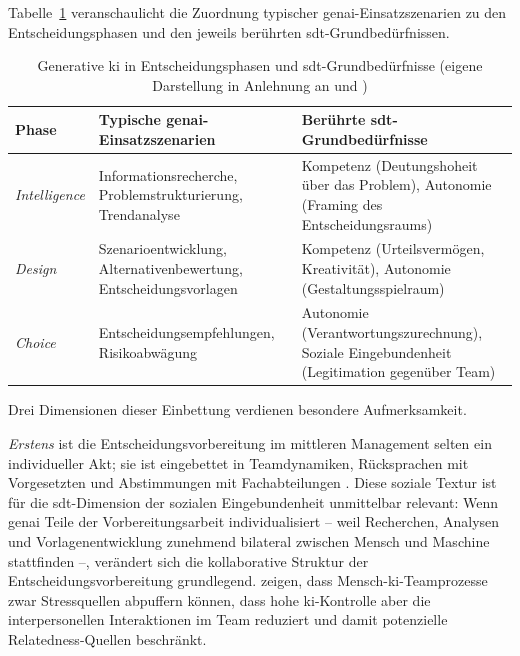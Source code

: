 Tabelle~\ref{tab:ki-entscheidungsphasen} veranschaulicht die Zuordnung typischer \gls{genai}-Einsatzszenarien zu den Entscheidungsphasen und den jeweils berührten \acrshort{sdt}-Grundbedürfnissen.

\begin{table}[ht]
\centering
\caption{Generative \acrshort{ki} in Entscheidungsphasen und \acrshort{sdt}-Grundbedürfnisse (eigene Darstellung in Anlehnung an \textcite{simonNewScienceManagement1977} und \textcite{hermannGenAIPsychologyWork2025})}
\label{tab:ki-entscheidungsphasen}
\begin{tabularx}{\textwidth}{lXX}
\toprule
\textbf{Phase} & \textbf{Typische \acrshort{genai}-Einsatzszenarien} & \textbf{Berührte \acrshort{sdt}-Grundbedürfnisse} \\
\midrule
\textit{Intelligence} & Informationsrecherche, Problemstrukturierung, Trendanalyse & Kompetenz (Deutungshoheit über das Problem), Autonomie (Framing des Entscheidungsraums) \\
\textit{Design} & Szenarioentwicklung, Alternativenbewertung, Entscheidungsvorlagen & Kompetenz (Urteilsvermögen, Kreativität), Autonomie (Gestaltungsspielraum) \\
\textit{Choice} & Entscheidungsempfehlungen, Risikoabwägung & Autonomie (Verantwortungszurechnung), Soziale Eingebundenheit (Legitimation gegenüber Team) \\
\bottomrule
\end{tabularx}
\end{table}

Drei Dimensionen dieser Einbettung verdienen besondere Aufmerksamkeit.

\textit{Erstens} ist die Entscheidungsvorbereitung im mittleren Management selten ein individueller Akt; sie ist eingebettet in Teamdynamiken, Rücksprachen mit Vorgesetzten und Abstimmungen mit Fachabteilungen \parencite[vgl.][]{langleyOpeningDecisionMaking1995, Mintzberg1973Nature}. Diese soziale Textur ist für die \acrshort{sdt}-Dimension der sozialen Eingebundenheit unmittelbar relevant: Wenn \gls{genai} Teile der Vorbereitungsarbeit individualisiert -- weil Recherchen, Analysen und Vorlagenentwicklung zunehmend bilateral zwischen Mensch und Maschine stattfinden --, verändert sich die kollaborative Struktur der Entscheidungsvorbereitung grundlegend. \textcite{klonek_does_2025} zeigen, dass Mensch-\acrshort{ki}-Teamprozesse zwar Stressquellen abpuffern können, dass hohe \acrshort{ki}-Kontrolle aber die interpersonellen Interaktionen im Team reduziert und damit potenzielle Relatedness-Quellen beschränkt.

